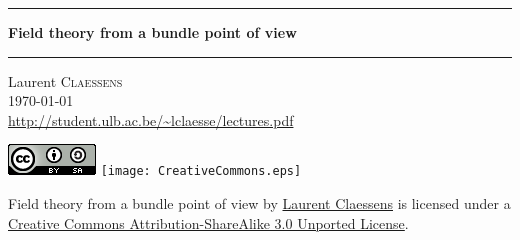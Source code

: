 



\makeindex
\makenomenclature








\thispagestyle{empty}
\begin{center}
  \begin{minipage}{15cm}
    \hrule\par
    \vspace{2mm}
    \begin{center}
    \Huge \bfseries Field theory from a bundle point of view \par
    \end{center}
    \hrule\par
  \end{minipage}
\end{center}

\vspace{2cm}

\begin{center}
    Laurent \textsc{Claessens}\\
    \today\\
    \url{http://student.ulb.ac.be/~lclaesse/lectures.pdf}
\end{center}

\vfill

\begin{center}

        \ifpdf
            \includegraphics{CreativeCommons.png}
        \else
            \texttt{[image: CreativeCommons.eps]}
        \fi

        Field theory from a bundle point of view by \href{http://student.ulb.ac.be/~lclaesse/research_page.html}{Laurent Claessens} is licensed under a \href{http://creativecommons.org/licenses/by-sa/3.0/}{Creative Commons Attribution-ShareAlike 3.0 Unported License}.
\end{center}


